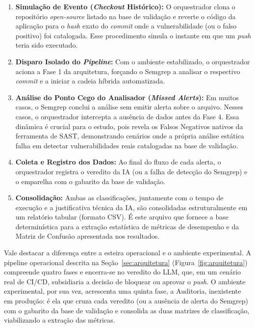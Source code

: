 \begin{enumerate}
    \item \textbf{Simulação de Evento (\textit{Checkout} Histórico):} O orquestrador clona o repositório \textit{open-source} listado na base de validação e reverte o código da aplicação para o \textit{hash} exato do \textit{commit} onde a vulnerabilidade (ou o falso positivo) foi catalogada. Esse procedimento simula o instante em que um \textit{push} teria sido executado.
    \item \textbf{Disparo Isolado do \textit{Pipeline}:} Com o ambiente estabilizado, o orquestrador aciona a Fase 1 da arquitetura, forçando o Semgrep a analisar o respectivo \textit{commit} e a iniciar a cadeia híbrida automatizada.
    \item \textbf{Análise do Ponto Cego do Analisador (\textit{Missed Alerts}):} Em muitos casos, o Semgrep conclui a análise sem emitir alerta sobre o arquivo. Nesses casos, o orquestrador intercepta a ausência de dados antes da Fase 4. Essa dinâmica é crucial para o estudo, pois revela os Falsos Negativos nativos da ferramenta de SAST, demonstrando cenários onde a própria análise estática falha em detectar vulnerabilidades reais catalogadas na base de validação.
    \item \textbf{Coleta e Registro dos Dados:} Ao final do fluxo de cada alerta, o orquestrador registra o veredito da IA (ou a falha de detecção do Semgrep) e o emparelha com o gabarito da base de validação.
    \item \textbf{Consolidação:} Ambas as classificações, juntamente com o tempo de execução e a justificativa técnica da IA, são consolidadas estruturalmente em um relatório tabular (formato CSV). É este arquivo que fornece a base determinística para a extração estatística de métricas de desempenho e da Matriz de Confusão apresentada nos resultados.
\end{enumerate}

Vale destacar a diferença entre a esteira operacional e o ambiente experimental. A pipeline operacional descrita na Seção~\ref{sec:arquitetura} (Figura~\ref{fig:arquitetura}) compreende quatro fases e encerra-se no veredito do LLM, que, em um cenário real de CI/CD, subsidiaria a decisão de bloquear ou aprovar o \textit{push}. O ambiente experimental, por sua vez, acrescenta uma quinta fase, a Auditoria, inexistente em produção: é ela que cruza cada veredito (ou a ausência de alerta do Semgrep) com o gabarito da base de validação e consolida as duas matrizes de classificação, viabilizando a extração das métricas.

